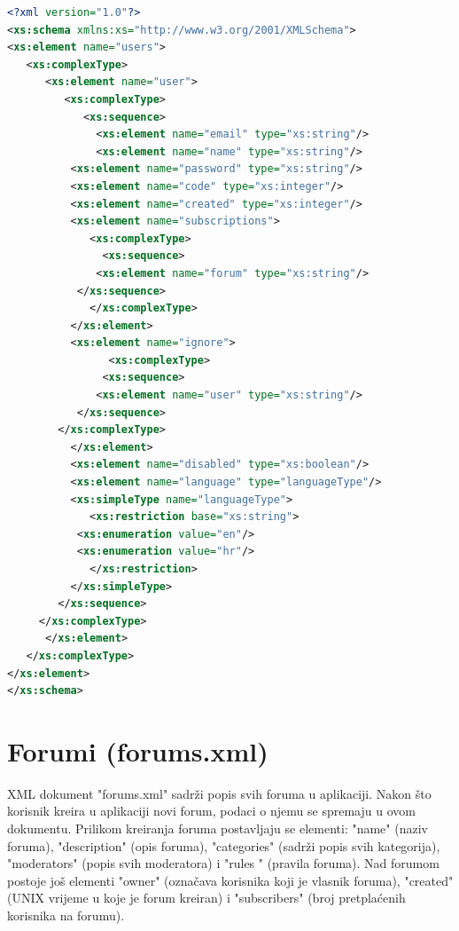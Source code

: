 \documentclass{foi}
\begin{document}
\begin{lstlisting}[language=XML]
 <?xml version="1.0"?>
<xs:schema xmlns:xs="http://www.w3.org/2001/XMLSchema">
<xs:element name="users">
   <xs:complexType>
      <xs:element name="user">
         <xs:complexType>
            <xs:sequence>
              <xs:element name="email" type="xs:string"/>
              <xs:element name="name" type="xs:string"/>
	      <xs:element name="password" type="xs:string"/>
	      <xs:element name="code" type="xs:integer"/>
	      <xs:element name="created" type="xs:integer"/>
	      <xs:element name="subscriptions">
	         <xs:complexType>
	           <xs:sequence>
		      <xs:element name="forum" type="xs:string"/>
		   </xs:sequence>
	         </xs:complexType>
	      </xs:element>
	      <xs:element name="ignore">
                <xs:complexType>
	           <xs:sequence>
		      <xs:element name="user" type="xs:string"/>
 		   </xs:sequence>
		</xs:complexType>
	      </xs:element>
	      <xs:element name="disabled" type="xs:boolean"/>
	      <xs:element name="language" type="languageType"/>
	      <xs:simpleType name="languageType">
	         <xs:restriction base="xs:string">
		   <xs:enumeration value="en"/>
		   <xs:enumeration value="hr"/>
	         </xs:restriction>
	      </xs:simpleType>
	    </xs:sequence>
	 </xs:complexType>
      </xs:element>
   </xs:complexType>
</xs:element>
</xs:schema> 
\end{lstlisting}

\section{Forumi (forums.xml)}

XML dokument "forums.xml" sadrži popis svih foruma u aplikaciji. Nakon što korisnik kreira u aplikaciji novi forum, podaci o njemu se spremaju u ovom dokumentu. Prilikom kreiranja foruma postavljaju se elementi: "name" (naziv foruma), "description" (opis foruma), "categories" (sadrži popis svih kategorija), "moderators" (popis svih moderatora) i "rules " (pravila foruma). Nad forumom postoje još elementi "owner" (označava korisnika koji je vlasnik foruma), "created" (UNIX vrijeme u koje je forum kreiran) i "subscribers" (broj pretplaćenih korisnika na forumu).
\end{document}
